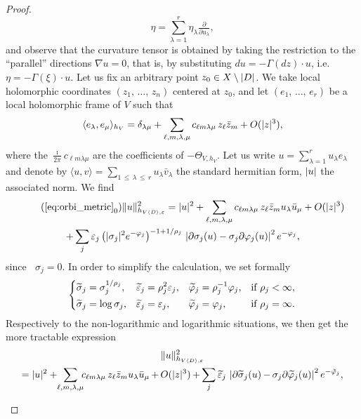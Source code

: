 \documentclass[AHL,Unicode,longabstracts,published]{cedram}
\DeclareMathOperator{\dbar}{\bar\partial}
\DeclarePairedDelimiter{\abs}{\lvert}{\rvert}
\DeclarePairedDelimiter{\Abs}{\lVert}{\rVert}
\let\leq\leqslant
\let\oldtilde\tilde
\renewcommand*{\tilde}[1]{\mathchoice{\widetilde{#1}}{\widetilde{#1}}{\oldtilde{#1}}{\oldtilde{#1}}}
\begin{document}
\begin{proof}
\[\eta=\sum_{\lambda=1}^r\eta_\lambda\tfrac{\partial}{\partial u_\lambda},
\]
and observe that the curvature tensor is obtained by taking the restriction to the ``parallel'' directions $\nabla u=0$, that is, by substituting $du=-\Gamma(dz)\cdot u$, i.e.\
$\eta=-\Gamma(\xi)\cdot u$. Let us fix an arbitrary point
$z_0\in X\setminus\abs{D}$. We take local holomorphic coordinates $(z_1,\,\dotsc,\,z_n)$ centered at $z_0$, and let $(e_1,\,\dotsc,\,e_r)$ be a local holomorphic frame of $V$ such that
\[
\langle e_\lambda,e_\mu\rangle_{h_V}=\delta_{\lambda\mu}+
\sum_{\ell,m,\lambda,\mu}c_{\ell m\lambda\mu}\,z_\ell\bar z_m+O(\abs{z}^3),
\]
where the $\tfrac{\imath}{ 2\pi}c_{\ell m\lambda\mu}$ are the coefficients of
$-\Theta_{V,h_V}$. Let us write $u=\sum_{\lambda=1}^ru_\lambda e_\lambda$ and denote by $\langle u,v\rangle=\sum_{1\,\leq\,\lambda\,\leq\,r}u_\lambda\bar v_\lambda$ the standard hermitian form, $\abs{u}$ the associated norm. We find
\begin{multline*}
\tag{$\ref{eq:orbi_metric}_{0}$}\label{6.4_0}
\Abs{u}_{h_{V\langle D\rangle,\varepsilon}}^2 =
\abs{u}^2+\sum_{\ell,m,\lambda,\mu}c_{\ell m\lambda\mu}\,z_\ell\bar z_m u_\lambda\bar u_\mu+O(\abs{z}^3)
\\
+\sum_j\varepsilon_j\,\big(\abs{\sigma_j}^2e^{-\varphi_j}\big)^{-1+1/\rho_j}\,
\left|\partial\sigma_j(u)-\sigma_j\partial\varphi_j(u)\right|^2 e^{-\varphi_j},
\end{multline*}
since $\dbar\sigma_j=0$. In order to simplify the calculation, we set formally
\[
\left\{
\begin{aligned}
\tilde\sigma_j&=\sigma_j^{1/\rho_j}, &
\tilde\varepsilon_j&=\rho_j^2\varepsilon_j, &
\tilde\varphi_j&=\rho_j^{-1}\varphi_j, &&
\text{if }\rho_j<\infty, \\
\tilde\sigma_j&=\log\sigma_j, &
\tilde\varepsilon_j&=\varepsilon_j, &
\tilde\varphi_j&=\varphi_j,\hfill &&
\text{if }\rho_j=\infty.
\end{aligned}
\right.
\]
Respectively to the non-logarithmic and logarithmic situations, we then get the more tractable expression
\begin{multline}
\Abs{u}_{h_{V\langle D\rangle,\varepsilon}}^2 \\
=\abs{u}^2+{}\kern-4pt
\sum_{\ell,m,\lambda,\mu}\kern-4pt c_{\ell m\lambda\mu}\,z_\ell\bar z_m u_\lambda\bar u_\mu\,{+}\,O(\abs{z}^3)
\,{+}\sum_j\tilde\varepsilon_j\,
\left|\partial\tilde\sigma_j(u)\,{-}\,\sigma_j\partial\tilde\varphi_j(u)\right|^2 e^{-\tilde\varphi_j},
\end{multline}
\begin{multline}

\end{multline}
\end{proof}
\end{document}
